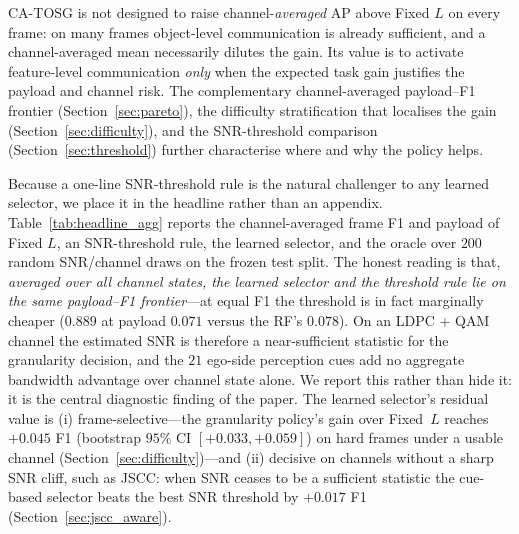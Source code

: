 \documentclass[journal]{IEEEtran}
\newcommand{\method}{CA-TOSG}
\begin{document}
\method{} is not designed to raise channel-\emph{averaged} AP above Fixed $L$ on every frame: on many frames object-level communication is already sufficient, and a channel-averaged mean necessarily dilutes the gain. Its value is to activate feature-level communication \emph{only} when the expected task gain justifies the payload and channel risk. The complementary channel-averaged payload--F1 frontier (Section~\ref{sec:pareto}), the difficulty stratification that localises the gain (Section~\ref{sec:difficulty}), and the SNR-threshold comparison (Section~\ref{sec:threshold}) further characterise where and why the policy helps.

Because a one-line SNR-threshold rule is the natural challenger to any learned selector, we place it in the headline rather than an appendix. Table~\ref{tab:headline_agg} reports the channel-averaged frame F1 and payload of Fixed $L$, an SNR-threshold rule, the learned selector, and the oracle over $200$ random SNR/channel draws on the frozen test split. The honest reading is that, \emph{averaged over all channel states, the learned selector and the threshold rule lie on the same payload--F1 frontier}---at equal F1 the threshold is in fact marginally cheaper ($0.889$ at payload $0.071$ versus the RF's $0.078$). On an LDPC + QAM channel the estimated SNR is therefore a near-sufficient statistic for the granularity decision, and the $21$ ego-side perception cues add no aggregate bandwidth advantage over channel state alone. We report this rather than hide it: it is the central diagnostic finding of the paper. The learned selector's residual value is (i) frame-selective---the granularity policy's gain over Fixed~$L$ reaches $+0.045$ F1 (bootstrap $95\%$ CI $[+0.033,+0.059]$) on hard frames under a usable channel (Section~\ref{sec:difficulty})---and (ii) decisive on channels without a sharp SNR cliff, such as JSCC: when SNR ceases to be a sufficient statistic the cue-based selector beats the best SNR threshold by $+0.017$ F1 (Section~\ref{sec:jscc_aware}).
\end{document}

